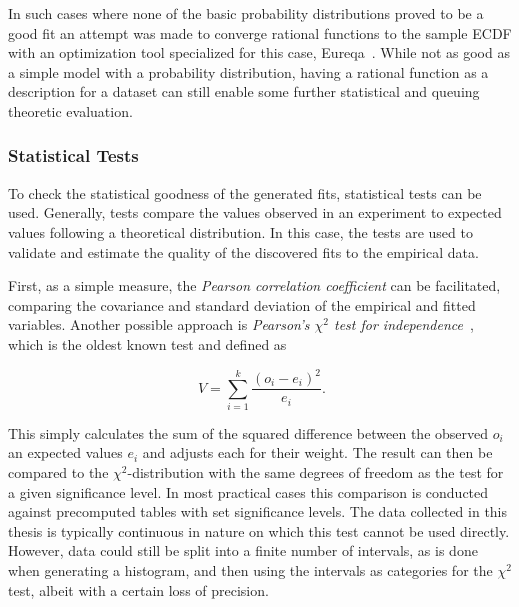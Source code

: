 In such cases where none of the basic probability distributions proved to be a good fit an attempt was made to converge rational functions to the sample \gls{ECDF} with an optimization tool specialized for this case, Eureqa~\cite{eureqa_software, eureqa_paper}. While not as good as a simple model with a probability distribution, having a rational function as a description for a dataset can still enable some further statistical and queuing theoretic evaluation.


\subsubsection{Statistical Tests}

To check the statistical goodness of the generated fits, statistical tests can be used. Generally, tests compare the values observed in an experiment to expected values following a theoretical distribution. In this case, the tests are used to validate and estimate the quality of the discovered fits to the empirical data.

First, as a simple measure, the \textit{Pearson correlation coefficient} can be facilitated, comparing the covariance and standard deviation of the empirical and fitted variables. Another possible approach is \textit{Pearson's $\chi^2$ test for independence}~\cite{doi:10.1080/14786440009463897}, which is the oldest known test and defined as

\begin{equation}
	\phantom{.}V=\sum_{i=1}^{k} \frac{{(o_i - e_i)}^2}{e_i}\text{.}
\end{equation}

This simply calculates the sum of the squared difference between the observed $o_i$ an expected values $e_i$ and adjusts each for their weight. The result can then be compared to the $\chi^2$-distribution with the same degrees of freedom
as the test for a given significance level. In most practical cases this comparison is conducted against precomputed tables with set significance levels. The data collected in this thesis is typically continuous in nature on which this test cannot be used directly. However, data could still be split into a finite number of intervals, as is done when generating a histogram, and then using the intervals as categories for the $\chi^2$ test, albeit with a certain loss of precision.


